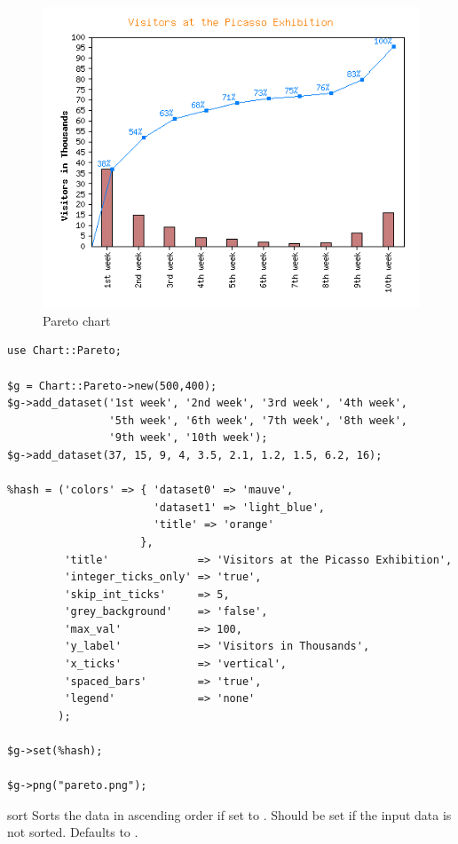 \begin{figure}[ht]
  \begin{center}
    \includegraphics[scale=0.7]{d_pareto2.png}
  \end{center}
  \caption{Pareto chart}
  \label{fig:pareto}
\end{figure}
\begin{verbatim}
use Chart::Pareto;

$g = Chart::Pareto->new(500,400);
$g->add_dataset('1st week', '2nd week', '3rd week', '4th week',
                '5th week', '6th week', '7th week', '8th week',
                '9th week', '10th week');
$g->add_dataset(37, 15, 9, 4, 3.5, 2.1, 1.2, 1.5, 6.2, 16);

%hash = ('colors' => { 'dataset0' => 'mauve',
                       'dataset1' => 'light_blue',
                       'title' => 'orange'
                     },
         'title'              => 'Visitors at the Picasso Exhibition',
         'integer_ticks_only' => 'true',
         'skip_int_ticks'     => 5,
         'grey_background'    => 'false',
         'max_val'            => 100,
         'y_label'            => 'Visitors in Thousands',
         'x_ticks'            => 'vertical',
         'spaced_bars'        => 'true',
         'legend'             => 'none'
        );

$g->set(%hash);

$g->png("pareto.png");
\end{verbatim}

\constructorblurb{\thisname}

\begin{AttrDecl}{sort}
Sorts the data in ascending order if set to . Should be set if
the input data is not sorted. Defaults to .
\end{AttrDecl}

